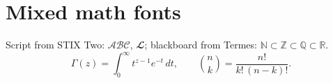 \documentclass{article}
\begin{document}
\section{Mixed math fonts}
Script from STIX Two: $\mathscr{A}\mathscr{B}\mathscr{C}$, $\mathbfscr{L}$;
blackboard from Termes: $\mathbb{N}\subset\mathbb{Z}\subset\mathbb{Q}\subset\mathbb{R}$.
\[ \Gamma(z) = \int_0^\infty t^{z-1}e^{-t}\,dt, \qquad
   \binom{n}{k} = \frac{n!}{k!\,(n-k)!}. \]
\end{document}
